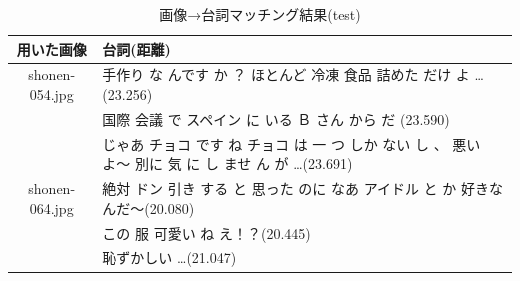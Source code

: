 \documentclass[onecolumn]{ujarticle}   %
\begin{document}
	\begin{table}[h]
		\vspace{-3mm}
		\centering
		\caption{画像→台詞マッチング結果(test)}
		\label{tab:result}
		\begin{tabular}{|c|p{11cm}|} \hline
			用いた画像&台詞(距離)\\ \hline\hline
			\multirow{1}{*}{shonen-054.jpg}&手作り な んです か ？ ほとんど 冷凍 食品 詰めた だけ よ …(23.256) \\ \cline{2-2}
			&国際 会議 で スペイン に いる Ｂ さん から だ (23.590) \\ \cline{2-2}
			&じゃあ チョコ です ね チョコ は 一 つ しか ない し 、 悪い よ〜 別に 気 に し ませ ん が …(23.691) \\ \hline
			\multirow{1}{*}{shonen-064.jpg}&絶対 ドン 引き する と 思った のに なあ アイドル と か 好きな んだ〜(20.080) \\ \cline{2-2}
			&この 服 可愛い ね え！？(20.445) \\ \cline{2-2}
			&恥ずかしい …(21.047) \\ \hline
		\end{tabular}
	\end{table}
\end{document}
